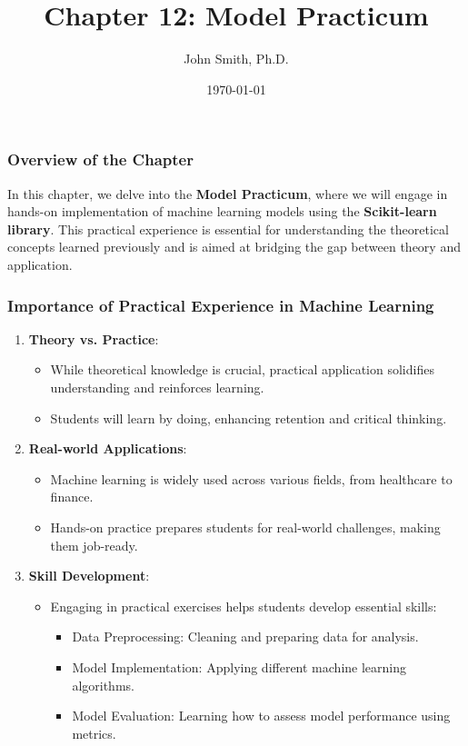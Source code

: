 \documentclass[aspectratio=169]{beamer}
\title[Chapter 12: Model Practicum]{Chapter 12: Model Practicum}
\author[J. Smith]{John Smith, Ph.D.}
\institute[University Name]{
  Department of Computer Science\\
  University Name\\
  \vspace{0.3cm}
  Email: email@university.edu\\
  Website: www.university.edu
}
\date{\today}
\begin{document}
\frame{\titlepage}

\begin{frame}[fragile]
    \titlepage
\end{frame}

\begin{frame}[fragile]
    \frametitle{Overview of the Chapter}
    In this chapter, we delve into the \textbf{Model Practicum}, where we will engage in hands-on implementation of machine learning models using the \textbf{Scikit-learn library}. This practical experience is essential for understanding the theoretical concepts learned previously and is aimed at bridging the gap between theory and application.
\end{frame}

\begin{frame}[fragile]
    \frametitle{Importance of Practical Experience in Machine Learning}
    \begin{enumerate}
        \item \textbf{Theory vs. Practice}: 
        \begin{itemize}
            \item While theoretical knowledge is crucial, practical application solidifies understanding and reinforces learning.
            \item Students will learn by doing, enhancing retention and critical thinking.
        \end{itemize}
        
        \item \textbf{Real-world Applications}: 
        \begin{itemize}
            \item Machine learning is widely used across various fields, from healthcare to finance.
            \item Hands-on practice prepares students for real-world challenges, making them job-ready.
        \end{itemize}
        
        \item \textbf{Skill Development}: 
        \begin{itemize}
            \item Engaging in practical exercises helps students develop essential skills:
            \begin{itemize}
                \item Data Preprocessing: Cleaning and preparing data for analysis.
                \item Model Implementation: Applying different machine learning algorithms.
                \item Model Evaluation: Learning how to assess model performance using metrics.
            \end{itemize}
        \end{itemize}
    \end{enumerate}
\end{frame}
\end{document}
